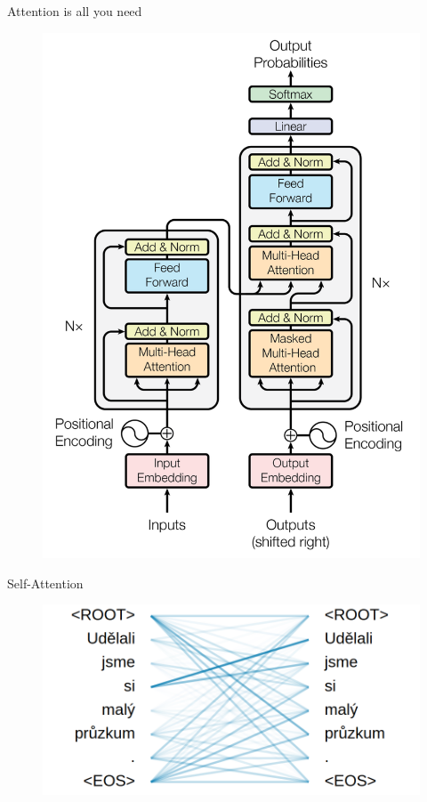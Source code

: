\documentclass{beamer}
\begin{document}

\begin{frame}{Attention is all you need \citep{DBLP:conf/nips/VaswaniSPUJGKP17}}
\begin{figure}[t]
    \centering
    \includegraphics[width=0.5\linewidth]{img/transformer.png}
\end{figure}
\end{frame}


\begin{frame}{Self-Attention \citep{cheng-dong-lapata:2016:EMNLP2016}}
    \begin{figure}[t]
    \centering
    \includegraphics[width=0.6\linewidth]{img/self-att-sample.png}
    \end{figure}
\end{frame}

\end{document}
